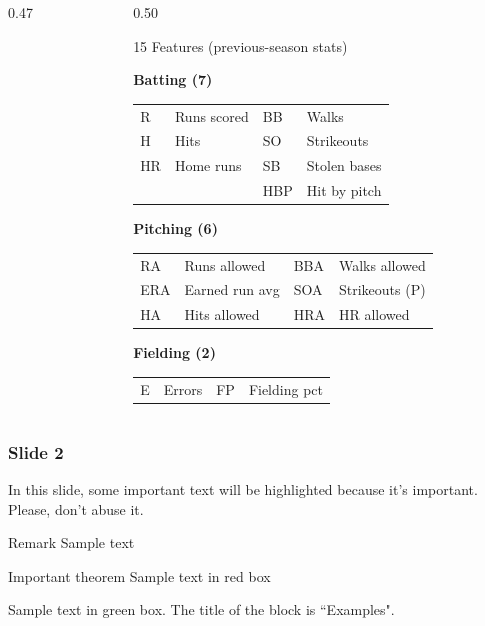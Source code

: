 \documentclass{beamer}
\begin{document}
\begin{frame}[t]
\begin{columns}[T]
\begin{column}{0.47\textwidth}
\end{column}

\begin{column}{0.50\textwidth}

\begin{block}{\scriptsize 15 Features (previous-season stats)}
\vspace{-2pt}
{\scriptsize

\textbf{Batting (7)}\\[1pt]
\begin{tabular}{@{}l@{\;}l@{\qquad}l@{\;}l@{}}
  R  & Runs scored  & BB  & Walks \\
  H  & Hits         & SO  & Strikeouts \\
  HR & Home runs    & SB  & Stolen bases \\
     &              & HBP & Hit by pitch \\
\end{tabular}

\vspace{3pt}
\textbf{Pitching (6)}\\[1pt]
\begin{tabular}{@{}l@{\;}l@{\qquad}l@{\;}l@{}}
  RA  & Runs allowed   & BBA & Walks allowed \\
  ERA & Earned run avg & SOA & Strikeouts (P) \\
  HA  & Hits allowed   & HRA & HR allowed \\
\end{tabular}

\vspace{3pt}
\textbf{Fielding (2)}\\[1pt]
\begin{tabular}{@{}l@{\;}l@{\qquad}l@{\;}l@{}}
  E  & Errors & FP & Fielding pct \\
\end{tabular}

}
\vspace{-2pt}
\end{block}

\end{column}
\end{columns}

\end{frame}


\begin{frame}
\frametitle{Slide 2}

In this slide, some important text will be
\alert{highlighted} because it's important.
Please, don't abuse it.

\begin{block}{Remark}
Sample text
\end{block}

\begin{alertblock}{Important theorem}
Sample text in red box
\end{alertblock}

\begin{examples}
Sample text in green box. The title of the block is ``Examples".
\end{examples}
\end{frame}
\end{document}
